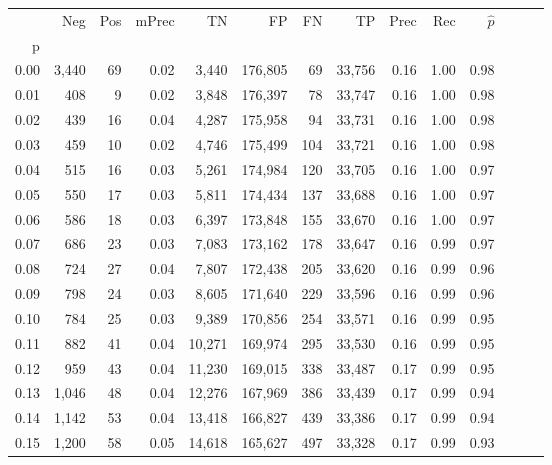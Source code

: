 \begin{tabular}{rrrrrrrrrrrrrr}
\toprule
{} &    Neg &  Pos & mPrec &       TN &       FP &      FN &      TP &  Prec &   Rec & $\hat{p}$ \\
p    &        &      &       &          &          &         &         &       &       &           \\
\midrule
0.00 &  3,440 &   69 &  0.02 &    3,440 &  176,805 &      69 &  33,756 &  0.16 &  1.00 &      0.98 \\
0.01 &    408 &    9 &  0.02 &    3,848 &  176,397 &      78 &  33,747 &  0.16 &  1.00 &      0.98 \\
0.02 &    439 &   16 &  0.04 &    4,287 &  175,958 &      94 &  33,731 &  0.16 &  1.00 &      0.98 \\
0.03 &    459 &   10 &  0.02 &    4,746 &  175,499 &     104 &  33,721 &  0.16 &  1.00 &      0.98 \\
0.04 &    515 &   16 &  0.03 &    5,261 &  174,984 &     120 &  33,705 &  0.16 &  1.00 &      0.97 \\
0.05 &    550 &   17 &  0.03 &    5,811 &  174,434 &     137 &  33,688 &  0.16 &  1.00 &      0.97 \\
0.06 &    586 &   18 &  0.03 &    6,397 &  173,848 &     155 &  33,670 &  0.16 &  1.00 &      0.97 \\
0.07 &    686 &   23 &  0.03 &    7,083 &  173,162 &     178 &  33,647 &  0.16 &  0.99 &      0.97 \\
0.08 &    724 &   27 &  0.04 &    7,807 &  172,438 &     205 &  33,620 &  0.16 &  0.99 &      0.96 \\
0.09 &    798 &   24 &  0.03 &    8,605 &  171,640 &     229 &  33,596 &  0.16 &  0.99 &      0.96 \\
0.10 &    784 &   25 &  0.03 &    9,389 &  170,856 &     254 &  33,571 &  0.16 &  0.99 &      0.95 \\
0.11 &    882 &   41 &  0.04 &   10,271 &  169,974 &     295 &  33,530 &  0.16 &  0.99 &      0.95 \\
0.12 &    959 &   43 &  0.04 &   11,230 &  169,015 &     338 &  33,487 &  0.17 &  0.99 &      0.95 \\
0.13 &  1,046 &   48 &  0.04 &   12,276 &  167,969 &     386 &  33,439 &  0.17 &  0.99 &      0.94 \\
0.14 &  1,142 &   53 &  0.04 &   13,418 &  166,827 &     439 &  33,386 &  0.17 &  0.99 &      0.94 \\
0.15 &  1,200 &   58 &  0.05 &   14,618 &  165,627 &     497 &  33,328 &  0.17 &  0.99 &      0.93 \\

\end{tabular}
